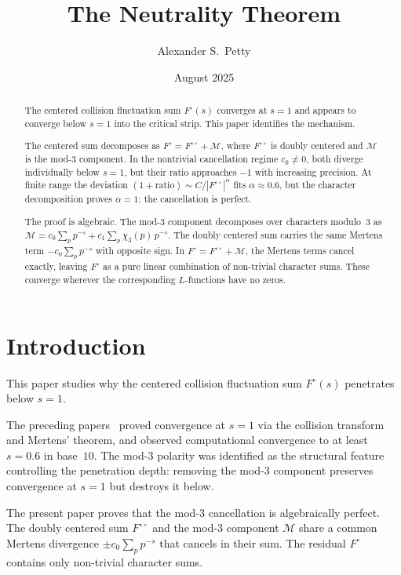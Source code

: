 \documentclass[12pt]{amsart}
\title{The Neutrality Theorem}
\author{Alexander S.\ Petty}
\date{August 2025}
\theoremstyle{definition}
\theoremstyle{remark}
\begin{document}
\begin{abstract}
The centered collision fluctuation sum $F^{\circ}(s)$
converges at $s = 1$ and appears to converge below
$s = 1$ into the critical strip. This paper identifies
the mechanism.

The centered sum decomposes as
$F^{\circ} = F^{\circ\circ} + \mathcal{M}$, where
$F^{\circ\circ}$ is doubly centered and $\mathcal{M}$
is the mod-$3$ component. In the nontrivial cancellation
regime $c_0 \ne 0$, both diverge individually below
$s = 1$, but their ratio approaches $-1$ with increasing
precision. At finite range the deviation
$(1 + \text{ratio}) \sim C / |F^{\circ\circ}|^{\alpha}$
fits $\alpha \approx 0.6$, but the character
decomposition proves $\alpha = 1$: the cancellation
is perfect.

The proof is algebraic. The mod-$3$ component
decomposes over characters modulo~$3$ as
$\mathcal{M} = c_0 \sum_p p^{-s} + c_1 \sum_p
\chi_3(p)\, p^{-s}$. The doubly centered sum carries
the same Mertens term $-c_0 \sum_p p^{-s}$ with
opposite sign. In $F^{\circ} = F^{\circ\circ} +
\mathcal{M}$, the Mertens terms cancel exactly,
leaving $F^{\circ}$ as a pure linear combination of
non-trivial character sums. These converge wherever
the corresponding $L$-functions have no zeros.
\end{abstract}
\maketitle

\section{Introduction}

This paper studies why the centered collision
fluctuation sum $F^{\circ}(s)$ penetrates below $s = 1$.

The preceding papers~\cite{paper16,paper17} proved
convergence at $s = 1$ via the collision transform and
Mertens' theorem, and observed computational convergence
to at least $s = 0.6$ in base~$10$. The mod-$3$ polarity
was identified as the structural feature controlling the
penetration depth: removing the mod-$3$ component
preserves convergence at $s = 1$ but destroys it below.

The present paper proves that the mod-$3$ cancellation
is algebraically perfect. The doubly centered sum
$F^{\circ\circ}$ and the mod-$3$ component $\mathcal{M}$
share a common Mertens divergence
$\pm c_0 \sum_p p^{-s}$ that cancels in their sum.
The residual $F^{\circ}$ contains only non-trivial
character sums.
\end{document}
